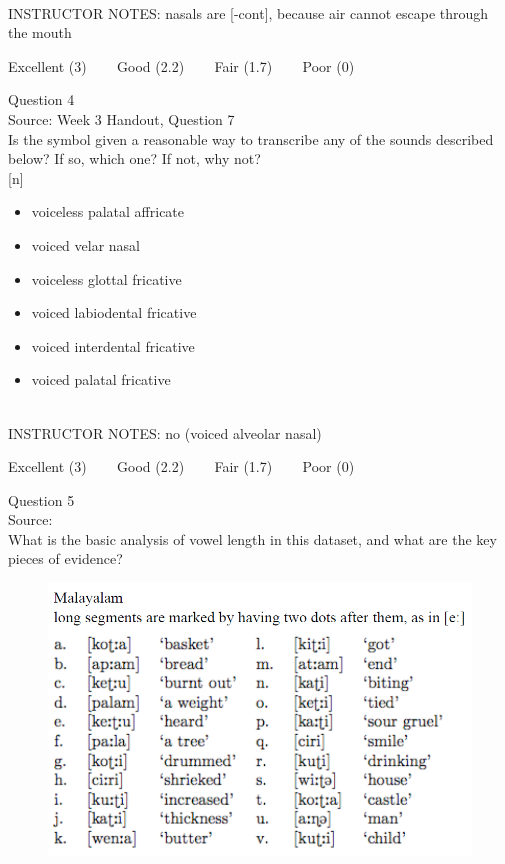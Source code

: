 \documentclass[12pt]{article}
\begin{document}
~\\
INSTRUCTOR NOTES: nasals are [-cont], because air cannot escape through the mouth


\vfill
Excellent (3) ~~~ Good (2.2) ~~~ Fair (1.7) ~~~ Poor (0)
\newpage

{\large Question 4}\\

Source: Week 3 Handout, Question 7\\

Is the symbol given a reasonable way to transcribe any of the sounds described below? If so, which one? If not, why not?\\

{[n]}

\begin{itemize} \item voiceless palatal affricate \item voiced velar nasal \item voiceless glottal fricative \item voiced labiodental fricative \item voiced interdental fricative \item voiced palatal fricative \end{itemize}


~\\
INSTRUCTOR NOTES: no (voiced alveolar nasal)


\vfill
Excellent (3) ~~~ Good (2.2) ~~~ Fair (1.7) ~~~ Poor (0)
\newpage

{\large Question 5}\\

Source: \\

What is the basic analysis of vowel length in this dataset, and what are the key pieces of evidence?\\

\begin{figure}[H]
\includegraphics{../images/malayalam.png}
\end{figure}
\end{document}
